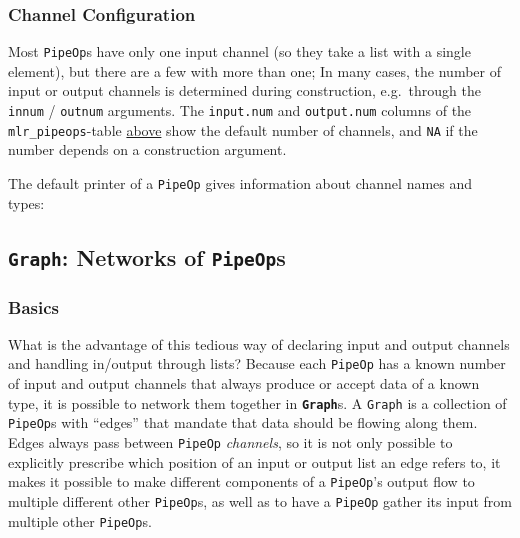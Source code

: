 \documentclass[]{scrbook}
\newenvironment{Shaded}{\begin{snugshade}}{\end{snugshade}}
\newcommand{\NormalTok}[1]{#1}
\renewenvironment{Shaded} {\begin{snugshade}\small} {\end{snugshade}}
\begin{document}
\hypertarget{channel-configuration}{%
\subsubsection{Channel Configuration}\label{channel-configuration}}

Most \texttt{PipeOp}s have only one input channel (so they take a list with a single element), but there are a few with more than one;
In many cases, the number of input or output channels is determined during construction, e.g.~through the \texttt{innum} / \texttt{outnum} arguments.
The \texttt{input.num} and \texttt{output.num} columns of the \texttt{mlr\_pipeops}-table \protect\hyperlink{where-to-get-pipeops}{above} show the default number of channels, and \texttt{NA} if the number depends on a construction argument.

The default printer of a \texttt{PipeOp} gives information about channel names and types:

\begin{Shaded}
\end{Shaded}

\hypertarget{graph-networks-of-pipeops}{%
\subsection{\texorpdfstring{\texttt{Graph}: Networks of \texttt{PipeOp}s}{Graph: Networks of PipeOps}}\label{graph-networks-of-pipeops}}

\hypertarget{basics-1}{%
\subsubsection{Basics}\label{basics-1}}

What is the advantage of this tedious way of declaring input and output channels and handling in/output through lists?
Because each \texttt{PipeOp} has a known number of input and output channels that always produce or accept data of a known type, it is possible to network them together in \textbf{\texttt{Graph}}s.
A \texttt{Graph} is a collection of \texttt{PipeOp}s with ``edges'' that mandate that data should be flowing along them.
Edges always pass between \texttt{PipeOp} \emph{channels}, so it is not only possible to explicitly prescribe which position of an input or output list an edge refers to, it makes it possible to make different components of a \texttt{PipeOp}'s output flow to multiple different other \texttt{PipeOp}s, as well as to have a \texttt{PipeOp} gather its input from multiple other \texttt{PipeOp}s.
\end{document}
